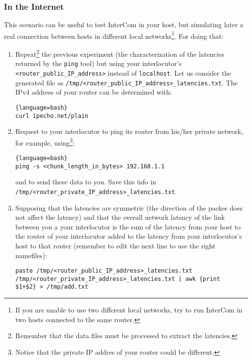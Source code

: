 \subsubsection{In the Internet}

This scenario can be useful to test InterCom in your host, but
simulating later a real connection between hosts in different local
networks\footnote{If you are unable to use two different local
  networks, try to run InterCom in two hosts connected to the same
  router.}. For doing that:

\begin{enumerate}
  
\item Repeat\footnote{Remember that the data files must be processed
    to extract the latencies.} the previous experiment (the
  characterization of the latencies returned by the \verb|ping| tool)
  but using your interlocutor's \verb|<router_public_IP_address>|
  instead of \verb|localhost|. Let us consider the generated file as
  \verb|/tmp/<router_public_IP_address>_latencies.txt|. The IPv4
  address of your router can be determined with:
  
  \begin{lstlisting}{language=bash}
curl ipecho.net/plain
  \end{lstlisting}  
  
\item Request to your interlocutor to ping its router from his/her
  private network, for example, using\footnote{Notice that the private
    IP addres of your router could be different.}:
  
  \begin{lstlisting}{language=bash}
ping -s <chunk_length_in_bytes> 192.168.1.1
  \end{lstlisting}
  
  and to send these data to you. Save this info in
  \verb|/tmp/<router_private_IP_address>_latencies.txt|.

\item Supposing that the latencies are symmetric (the direction of the
  packes does not affect the latency) and that the overall network
  latency of the link between you a your interlocutor is the sum of
  the latency from your host to the router of your interlocutor added
  to the latency from your interlocutor's host to that router
  (remember to edit the next line to use the right namefiles):

\texttt{paste /tmp/<router\_public\_IP\_address>\_latencies.txt /tmp/<router\_private\_IP\_address>\_latencies.txt | awk
  \textquotesingle\{print \$1+\$2\}\textquotesingle~> /tmp/add.txt}\\


\end{enumerate}
